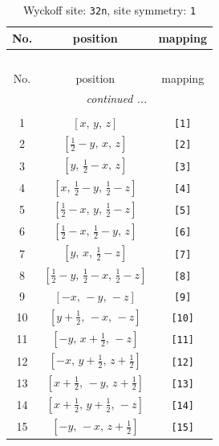 \documentclass[fleqn,8pt]{jsarticle}
\begin{document}
\renewcommand{\arraystretch}{1.2}
\begin{longtable}{ccc}
\caption{Wyckoff site: {\tt 32n}, site symmetry: {\tt 1}}
 \\
 \hline \hline
No. & position & mapping \\ \hline \endfirsthead

\multicolumn{2}{l}{\tablename\ \thetable{}} \\
 \hline \hline
No. & position & mapping \\ \hline \endhead

 \hline \hline
\multicolumn{2}{r}{\footnotesize\it continued ...} \\ \endfoot

 \hline \hline
\multicolumn{2}{r}{} \\ \endlastfoot

1 & $\left[ x,\, y,\, z \right]$ & {\tt [1]} \\ \hline
2 & $\left[ \frac{1}{2} - y,\, x,\, z \right]$ & {\tt [2]} \\ \hline
3 & $\left[ y,\, \frac{1}{2} - x,\, z \right]$ & {\tt [3]} \\ \hline
4 & $\left[ x,\, \frac{1}{2} - y,\, \frac{1}{2} - z \right]$ & {\tt [4]} \\ \hline
5 & $\left[ \frac{1}{2} - x,\, y,\, \frac{1}{2} - z \right]$ & {\tt [5]} \\ \hline
6 & $\left[ \frac{1}{2} - x,\, \frac{1}{2} - y,\, z \right]$ & {\tt [6]} \\ \hline
7 & $\left[ y,\, x,\, \frac{1}{2} - z \right]$ & {\tt [7]} \\ \hline
8 & $\left[ \frac{1}{2} - y,\, \frac{1}{2} - x,\, \frac{1}{2} - z \right]$ & {\tt [8]} \\ \hline
9 & $\left[ - x,\, - y,\, - z \right]$ & {\tt [9]} \\ \hline
10 & $\left[ y + \frac{1}{2},\, - x,\, - z \right]$ & {\tt [10]} \\ \hline
11 & $\left[ - y,\, x + \frac{1}{2},\, - z \right]$ & {\tt [11]} \\ \hline
12 & $\left[ - x,\, y + \frac{1}{2},\, z + \frac{1}{2} \right]$ & {\tt [12]} \\ \hline
13 & $\left[ x + \frac{1}{2},\, - y,\, z + \frac{1}{2} \right]$ & {\tt [13]} \\ \hline
14 & $\left[ x + \frac{1}{2},\, y + \frac{1}{2},\, - z \right]$ & {\tt [14]} \\ \hline
15 & $\left[ - y,\, - x,\, z + \frac{1}{2} \right]$ & {\tt [15]} \\ \hline

\end{longtable}
\end{document}
